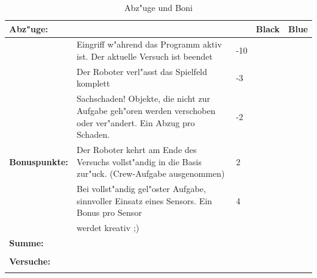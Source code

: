 \documentclass[12pt,colorbacktitle,accentcolor=tud1c]{tudexercise}
\begin{document}
	\begin{table}[h]
	\begin{tabular}{|p{}|p{}|p{}|p{}|p{}|} \hline
		\textbf{Abz"uge:}& \space &\space&\textbf{Black}&\textbf{Blue} \\ \hline 
		\space& Eingriff w"ahrend das Programm aktiv ist. Der aktuelle Versuch ist beendet &-10&\space&\space \\ \hline
		\space& Der Roboter verl"asst das Spielfeld komplett &-3&\space&\space \\ \hline
		\space& Sachschaden! Objekte, die nicht zur Aufgabe geh"oren werden verschoben oder ver"andert. Ein Abzug pro Schaden. &-2&\space&\space \\ \hline
		\textbf{Bonuspunkte:}& Der Roboter kehrt am Ende des Versuchs vollst"andig in die Basis zur"uck. (Crew-Aufgabe ausgenommen) &2&\space&\space \\ \hline
		\space& Bei vollst"andig gel"oster Aufgabe, sinnvoller Einsatz eines Sensors. Ein Bonus pro Sensor &4&\space&\space \\ \hline
		\space& werdet kreativ ;) & \space &\space&\space \\ \hline
		\textbf{Summe:}& \space &\space&\space&\space \\  
		\space& \space &\space&\space&\space \\  \hline
		\textbf{Versuche:}& \space &\space&\space&\space \\ 
		\space& \space &\space&\space&\space \\  \hline
	\end{tabular}
	\caption{Abz"uge und Boni}
\end{table}
  
   
    
\end{document}
